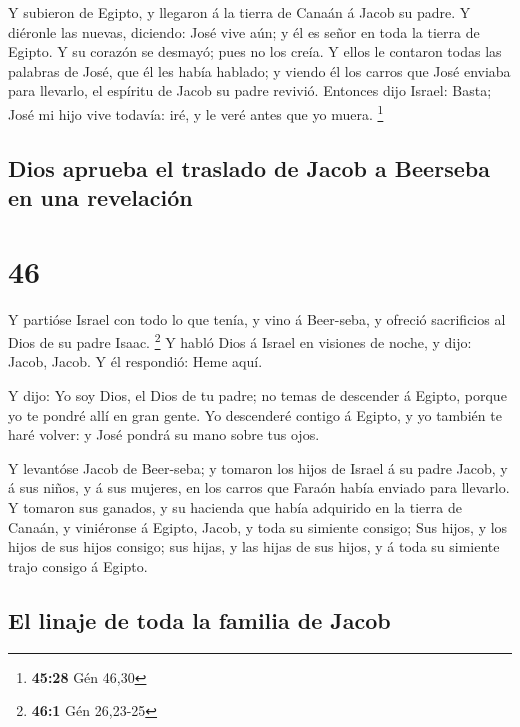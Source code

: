  Y subieron de Egipto, y llegaron á la tierra de Canaán á
Jacob su padre.  Y diéronle las nuevas, diciendo: José
vive aún; y él es señor en toda la tierra de Egipto. Y su corazón se
desmayó; pues no los creía.  Y ellos le contaron todas
las palabras de José, que él les había hablado; y viendo él los carros
que José enviaba para llevarlo, el espíritu de Jacob su padre revivió.
 Entonces dijo Israel: Basta; José mi hijo vive todavía:
iré, y le veré antes que yo muera. \footnote{\textbf{45:28} Gén 46,30}

\hypertarget{dios-aprueba-el-traslado-de-jacob-a-beerseba-en-una-revelaciuxf3n}{%
\subsection{Dios aprueba el traslado de Jacob a Beerseba en una
revelación}\label{dios-aprueba-el-traslado-de-jacob-a-beerseba-en-una-revelaciuxf3n}}

\hypertarget{section-45}{%
\section{46}\label{section-45}}

 Y partióse Israel con todo lo que tenía, y vino á
Beer-seba, y ofreció sacrificios al Dios de su padre Isaac. \footnote{\textbf{46:1}
  Gén 26,23-25}  Y habló Dios á Israel en visiones de
noche, y dijo: Jacob, Jacob. Y él respondió: Heme aquí.

 Y dijo: Yo soy Dios, el Dios de tu padre; no temas de
descender á Egipto, porque yo te pondré allí en gran gente.
 Yo descenderé contigo á Egipto, y yo también te haré
volver: y José pondrá su mano sobre tus ojos.

 Y levantóse Jacob de Beer-seba; y tomaron los hijos de
Israel á su padre Jacob, y á sus niños, y á sus mujeres, en los carros
que Faraón había enviado para llevarlo.  Y tomaron sus
ganados, y su hacienda que había adquirido en la tierra de Canaán, y
viniéronse á Egipto, Jacob, y toda su simiente consigo; 
Sus hijos, y los hijos de sus hijos consigo; sus hijas, y las hijas de
sus hijos, y á toda su simiente trajo consigo á Egipto.

\hypertarget{el-linaje-de-toda-la-familia-de-jacob}{%
\subsection{El linaje de toda la familia de
Jacob}\label{el-linaje-de-toda-la-familia-de-jacob}}

